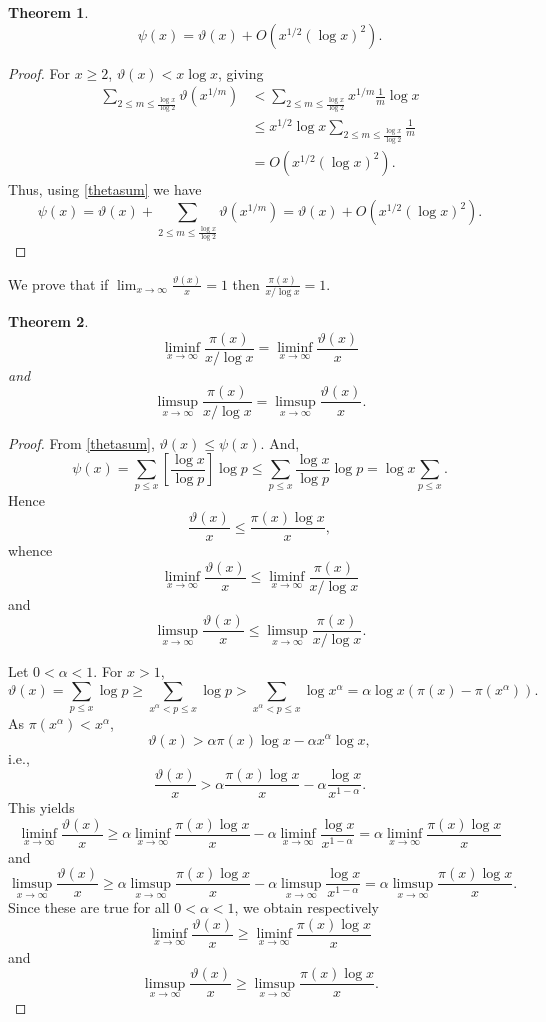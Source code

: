 \documentclass{amsart}
\newtheorem{theorem}{Theorem}
\begin{document}
\begin{theorem}
\[
\psi(x) = \vartheta(x)+O(x^{1/2} (\log x)^2).
\]
\label{psitheta}
\end{theorem}
\begin{proof}
For $x \geq 2$,
$\vartheta(x)<x \log x$, giving
\begin{align*}
 \sum_{2 \leq m 
\leq \frac{\log x}{\log 2}} \vartheta(x^{1/m})
&< \sum_{2 \leq m 
\leq \frac{\log x}{\log 2}} x^{1/m} \frac{1}{m} \log x\\
&\leq x^{1/2} \log x \sum_{2 \leq m \leq \frac{\log x}{\log 2}} \frac{1}{m}\\
&=O(x^{1/2}(\log x)^2).
\end{align*}
Thus, using \eqref{thetasum} we have
\[
\psi(x) = \vartheta(x) +  \sum_{2 \leq m 
\leq \frac{\log x}{\log 2}} \vartheta(x^{1/m})=
\vartheta(x)+O(x^{1/2}(\log x)^2).
\]
\end{proof}


We prove that if $\lim_{x \to \infty} \frac{\vartheta(x)}{x}=1$ then
$\frac{\pi(x)}{x/\log x}=1$.

\begin{theorem}
\[
\liminf_{x \to \infty} \frac{\pi(x)}{x/\log x}
=\liminf_{x \to \infty} \frac{\vartheta(x)}{x}
\]
and
\[
\limsup_{x \to \infty} \frac{\pi(x)}{x/\log x}
=\limsup_{x \to \infty} \frac{\vartheta(x)}{x}.
\]
\end{theorem}
\begin{proof}
From \eqref{thetasum}, $\vartheta(x) \leq \psi(x)$. And,
\[
\psi(x)
=\sum_{p \leq x} \left[ \frac{\log x}{\log p}\right] \log p
\leq \sum_{p \leq x} \frac{\log x}{\log p} \log p
=\log x \sum_{p \leq x}.
\]
Hence
\[
\frac{\vartheta(x)}{x} \leq \frac{\pi(x) \log x}{x},
\]
whence
\[
\liminf_{x \to \infty} \frac{\vartheta(x)}{x}
\leq
\liminf_{x \to \infty} \frac{\pi(x)}{x/\log x}
\]
and
\[
\limsup_{x \to \infty} \frac{\vartheta(x)}{x}
\leq
\limsup_{x \to \infty} \frac{\pi(x)}{x/\log x}.
\]



Let $0<\alpha<1$. For $x>1$,
\[
\vartheta(x) = \sum_{p \leq x} \log p
\geq \sum_{x^\alpha<p \leq x} \log p
>\sum_{x^\alpha<p \leq x} \log x^\alpha
=\alpha \log x(\pi(x)-\pi(x^\alpha)).
\]
As $\pi(x^\alpha)<x^\alpha$,
\[
\vartheta(x) > \alpha \pi(x) \log x - \alpha x^\alpha \log x,
\]
i.e.,
\[
\frac{\vartheta(x)}{x} > \alpha \frac{\pi(x) \log x}{x} - \alpha \frac{\log x}{x^{1-\alpha}}.
\]
This yields 
\[
\liminf_{x \to \infty} \frac{\vartheta(x)}{x} \geq \alpha \liminf_{x \to \infty}
\frac{\pi(x) \log x}{x} - \alpha
\liminf_{x \to \infty} \frac{\log x}{x^{1-\alpha}}
=\alpha \liminf_{x \to \infty}
\frac{\pi(x) \log x}{x}
\]
and
\[
\limsup_{x \to \infty} \frac{\vartheta(x)}{x} 
\geq 
\alpha \limsup_{x \to \infty}
\frac{\pi(x) \log x}{x} - \alpha
\limsup_{x \to \infty} \frac{\log x}{x^{1-\alpha}}
=\alpha \limsup_{x \to \infty}
\frac{\pi(x) \log x}{x}.
\]
Since these are true for  all $0<\alpha<1$, we obtain respectively
\[
\liminf_{x \to \infty} \frac{\vartheta(x)}{x} \geq 
\liminf_{x \to \infty}
\frac{\pi(x) \log x}{x}
\]
and
\[
\limsup_{x \to \infty} \frac{\vartheta(x)}{x} \geq 
\limsup_{x \to \infty}
\frac{\pi(x) \log x}{x}.
\]
\end{proof}
\end{document}
